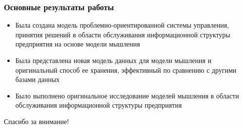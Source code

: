 \documentclass[14pt]{beamer}
\begin{document}
\begin{frame}
\frametitle{Основные результаты работы}
\begin{itemize}
   \item Была создана модель проблемно-ориентированной системы управления, принятия решений в области обслуживания информационной структуры предприятия на основе модели мышления
  \item Была представлена новая модель данных для модели мышления и оригинальный способ ее хранения, эффективный по сравнению с другими базами данных
  \item Было выполнено оригинальное исследование моделей мышления в области обслуживания информационной структуры предприятия
  
\end{itemize}
\end{frame}







\begin{frame}
\begin{center}
Спасибо за внимание!
\end{center}
\end{frame}
\end{document}
